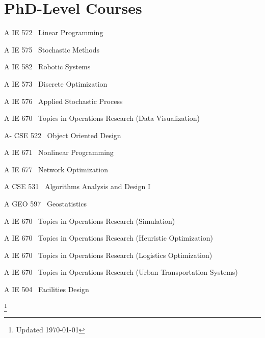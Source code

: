\documentclass[12pt,letterpaper]{report}
\begin{document}
    \section*{PhD-Level Courses}
    \begin{tablist}
        \item[A] \tab{}IE 572 \ Linear Programming
        \item[A] \tab{}IE 575 \ Stochastic Methods
        \item[A] \tab{}IE 582 \ Robotic Systems
        \item[A] \tab{}IE 573 \ Discrete Optimization
        \item[A] \tab{}IE 576 \ Applied Stochastic Process
        \item[A] \tab{}IE 670 \ Topics in Operations Research (Data Visualization)
        \item[A-]\tab{}CSE 522 \ Object Oriented Design
        \item[A] \tab{}IE 671 \ Nonlinear Programming
        \item[A] \tab{}IE 677 \ Network Optimization
        \item[A] \tab{}CSE 531 \ Algorithms Analysis and Design I
        \item[A] \tab{}GEO 597 \ Geostatistics
        \item[A] \tab{}IE 670 \ Topics in Operations Research (Simulation)
        \item[A] \tab{}IE 670 \ Topics in Operations Research (Heuristic Optimization)
        \item[A] \tab{}IE 670 \ Topics in Operations Research (Logistics Optimization)
        \item[A] \tab{}IE 670 \ Topics in Operations Research (Urban Transportation Systems)
        \item[A] \tab{}IE 504 \ Facilities Design
    \end{tablist}

    \let\thefootnote\relax\footnote{Updated \monthyeardate\today}
\end{document}
